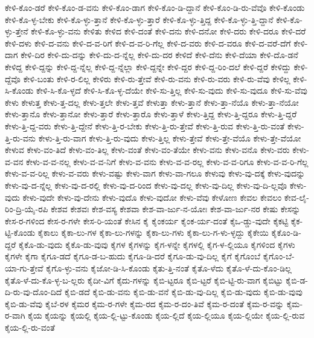 {ಕೇಳಿ-ಕೊಂ-ಡರೆ
ಕೇಳಿ-ಕೊಂ-ಡ-ವನು
ಕೇಳಿ-ಕೊಂ-ಡಾಗ
ಕೇಳಿ-ಕೊಂ-ಡಿ-ದ್ದಾನೆ
ಕೇಳಿ-ಕೊಂ-ಡಿ-ರು-ವೆವೊ
ಕೇಳಿ-ಕೊಂಡು
ಕೇಳಿ-ಕೊ-ಳ್ಳ-ಬೇಕು
ಕೇಳಿ-ಕೊ-ಳ್ಳು-ತ್ತಾನೆ
ಕೇಳಿ-ಕೊ-ಳ್ಳು-ತ್ತಾರೆ
ಕೇಳಿ-ಕೊ-ಳ್ಳು-ತ್ತಿದ್ದ
ಕೇಳಿ-ಕೊ-ಳ್ಳು-ತ್ತಿ-ದ್ದಾನೆ
ಕೇಳಿ-ಕೊ-ಳ್ಳು-ತ್ತೇನೆ
ಕೇಳಿ-ಕೊ-ಳ್ಳು-ವನು
ಕೇಳಿತು
ಕೇಳಿದ
ಕೇಳಿ-ದಂತೆ
ಕೇಳಿ-ದನು
ಕೇಳಿ-ದನೋ
ಕೇಳಿ-ದರು
ಕೇಳಿ-ದರೂ
ಕೇಳಿ-ದರೆ
ಕೇಳಿ-ದಳು
ಕೇಳಿ-ದ-ವನು
ಕೇಳಿ-ದ-ವ-ರಿಗೆ
ಕೇಳಿ-ದ-ವ-ರಿ-ಗೆಲ್ಲ
ಕೇಳಿ-ದ-ವರು
ಕೇಳಿ-ದ-ವರೂ
ಕೇಳಿ-ದ-ವರೆ-ದೆಗೆ
ಕೇಳಿ-ದಾಗ
ಕೇಳಿ-ದಿರ
ಕೇಳಿ-ದು-ದನ್ನು
ಕೇಳಿ-ದು-ದ-ನ್ನೆಲ್ಲ
ಕೇಳಿ-ದು-ದರ
ಕೇಳಿದೆ
ಕೇಳಿ-ದೆನು
ಕೇಳಿ-ದೆಯಾ
ಕೇಳಿ-ದೊ-ಡನೆ
ಕೇಳಿದ್ದ
ಕೇಳಿ-ದ್ದನ್ನು
ಕೇಳಿ-ದ್ದ-ನ್ನೆಲ್ಲ
ಕೇಳಿ-ದ್ದ-ನ್ನೆಲ್ಲಾ
ಕೇಳಿ-ದ್ದನ್ನೇ
ಕೇಳಿ-ದ್ದರ
ಕೇಳಿ-ದ್ದ-ರಿಂ-ದಲೆ
ಕೇಳಿ-ದ್ದರೆ
ಕೇಳಿದ್ದು
ಕೇಳಿ-ದ್ದೆವೊ
ಕೇಳಿ-ಬಂತು
ಕೇಳಿ-ರ-ಲಿಲ್ಲ
ಕೇಳಿರು
ಕೇಳಿ-ರು-ತ್ತೇವೆ
ಕೇಳಿ-ರು-ವನು
ಕೇಳಿ-ರು-ವರು
ಕೇಳಿ-ರು-ವೆವು
ಕೇಳಿಲ್ಲ
ಕೇಳಿ-ಸಿ-ಕೊಂಡು
ಕೇಳಿ-ಸಿ-ಕೊ-ಳ್ಳದೆ
ಕೇಳಿ-ಸಿ-ಕೊ-ಳ್ಳ-ದೆಯೇ
ಕೇಳಿ-ಸು-ತ್ತಿಲ್ಲ
ಕೇಳಿ-ಸು-ವುದು
ಕೇಳಿ-ಸು-ವುದೂ
ಕೇಳಿ-ಸು-ವೆವು
ಕೇಳು
ಕೇಳುತ್ತ
ಕೇಳು-ತ್ತ-ದಲ್ಲ
ಕೇಳು-ತ್ತಲೇ
ಕೇಳು-ತ್ತವೆ
ಕೇಳುತ್ತಾ
ಕೇಳು-ತ್ತಾನೆ
ಕೇಳು-ತ್ತಾ-ನೆಯೊ
ಕೇಳು-ತ್ತಾ-ನೆಯೋ
ಕೇಳು-ತ್ತಾನೊ
ಕೇಳು-ತ್ತಾನೋ
ಕೇಳು-ತ್ತಾರೆ
ಕೇಳು-ತ್ತಾರೊ
ಕೇಳು-ತ್ತಾಳೆ
ಕೇಳು-ತ್ತಿದ್ದ
ಕೇಳು-ತ್ತಿ-ದ್ದರೂ
ಕೇಳು-ತ್ತಿ-ದ್ದರೆ
ಕೇಳು-ತ್ತಿ-ದ್ದ-ವರು
ಕೇಳು-ತ್ತಿ-ದ್ದೇನೆ
ಕೇಳು-ತ್ತಿ-ರ-ಬೇಕು
ಕೇಳು-ತ್ತಿ-ರು-ತ್ತೇವೆ
ಕೇಳು-ತ್ತಿ-ರುವ
ಕೇಳು-ತ್ತಿ-ರು-ವಂತೆ
ಕೇಳು-ತ್ತಿ-ರು-ವನು
ಕೇಳು-ತ್ತಿ-ರು-ವಾಗ
ಕೇಳು-ತ್ತಿ-ರು-ವುದು
ಕೇಳು-ತ್ತಿಲ್ಲ
ಕೇಳು-ತ್ತೇವೆ
ಕೇಳು-ತ್ತೇ-ವೆಯೊ
ಕೇಳು-ತ್ತೇ-ವೆಯೋ
ಕೇಳುವ
ಕೇಳು-ವಂ-ತಿದೆ
ಕೇಳು-ವಂ-ತಿಲ್ಲ
ಕೇಳು-ವಂತೆ
ಕೇಳು-ವಂ-ತೆಯೇ
ಕೇಳು-ವನು
ಕೇಳು-ವನೊ
ಕೇಳು-ವರು
ಕೇಳು-ವ-ವನ
ಕೇಳು-ವ-ವ-ನಲ್ಲ
ಕೇಳು-ವ-ವ-ನಿಗೆ
ಕೇಳು-ವ-ವನು
ಕೇಳು-ವ-ವ-ರಲ್ಲ
ಕೇಳು-ವ-ವ-ರಿಗೂ
ಕೇಳು-ವ-ವ-ರಿ-ಗೆಲ್ಲ
ಕೇಳು-ವ-ವ-ರಿಲ್ಲ
ಕೇಳು-ವ-ವರು
ಕೇಳು-ವಷ್ಟು
ಕೇಳು-ವಾಗ
ಕೇಳು-ವಾ-ಗಲೂ
ಕೇಳುವು
ಕೇಳು-ವು-ದಕ್ಕೆ
ಕೇಳು-ವುದನ್ನು
ಕೇಳು-ವು-ದ-ನ್ನೆಲ್ಲ
ಕೇಳು-ವು-ದ-ರಲ್ಲಿ
ಕೇಳು-ವು-ದ-ರಿಂದ
ಕೇಳು-ವು-ದಲ್ಲ
ಕೇಳು-ವು-ದಿಲ್ಲ
ಕೇಳು-ವು-ದಿ-ಲ್ಲವೊ
ಕೇಳು-ವುದು
ಕೇಳು-ವುದೇ
ಕೇಳು-ವು-ದೇನು
ಕೇಳು-ವುದೊ
ಕೇಳು-ವುದೋ
ಕೇಳು-ವೆವು
ಕೇಳೋಣ
ಕೇವಲ
ಕೇವಲಂ
ಕೇವ-ಲೈ-ರಿಂ-ದ್ರಿ-ಯೈ-ರಪಿ
ಕೇಶವ
ಕೇಶವಃ
ಕೇಶ-ವಸ್ಯ
ಕೇಶವಾ
ಕೇಶ-ವಾ-ರ್ಜು-ನ-ಯೋಃ
ಕೇಶ-ವಾ-ರ್ಜು-ನರ
ಕೇಷು
ಕೇಸನ್ನು
ಕೇಸ-ರ-ಗಳಿಂದ
ಕೇಸ-ರ-ಗಳೇ
ಕೇಸ-ರಿ-ಯಂತೆ
ಕೇಸಿನ
ಕೈ
ಕೈಂಕರ್ಯ
ಕೈಂಕ-ರ್ಯ-ದಂತೆ
ಕೈಒ-ಡ್ಡು-ವುದೇ
ಕೈಕಟ್ಟಿ
ಕೈಕ-ಟ್ಟಿ-ಕೊಂಡು
ಕೈಕಾಲು
ಕೈಕಾ-ಲು-ಗಳ
ಕೈಕಾ-ಲು-ಗಳನ್ನು
ಕೈಕಾ-ಲು-ಗಳು
ಕೈಕಾ-ಲು-ಗ-ಳು-ಳ್ಳದ್ದು
ಕೈಕೇಯಿ
ಕೈಕೊಂ-ಡಿ-ದ್ದರೆ
ಕೈಕೊ-ಡು-ವುದು
ಕೈಕೊ-ಡು-ವುವು
ಕೈಗಳ
ಕೈಗಳನ್ನು
ಕೈಗ-ಳನ್ನೇ
ಕೈಗಳಲ್ಲಿ
ಕೈಗ-ಳ-ಲ್ಲಿಯೂ
ಕೈಗಳಿಂದ
ಕೈಗಳು
ಕೈಗಳೇ
ಕೈಗಾ
ಕೈಗೂ-ಡದೆ
ಕೈಗೂ-ಡ-ಬ-ಹುದು
ಕೈಗೂ-ಡಿ-ದರೆ
ಕೈಗೂ-ಡು-ವು-ದಿಲ್ಲ
ಕೈಗೆ
ಕೈಗೊಂಬೆ
ಕೈಗೊಂ-ಬೆ-ಯಾ-ಗು-ತ್ತೇವೆ
ಕೈಗೊ-ಳ್ಳು-ವನು
ಕೈಜೋ-ಡಿ-ಸಿ-ಕೊಂಡು
ಕೈತು-ತ್ತಿ-ನಂತೆ
ಕೈತೊ-ಳೆದು
ಕೈತೊ-ಳೆ-ದು-ಕೊಂ-ಡಿಲ್ಲ
ಕೈತೊ-ಳೆ-ದು-ಕೊ-ಳ್ಳ-ಬ-ಲ್ಲರು
ಕೈದೀ-ವಿಗೆ
ಕೈದು-ಗಳನ್ನು
ಕೈಬಿ-ಟ್ಟರೂ
ಕೈಬಿ-ಟ್ಟರೆ
ಕೈಬಿ-ಟ್ಟಿ-ರು-ವಾಗ
ಕೈಬಿಟ್ಟು
ಕೈಬಿ-ಡ-ದಿ-ರು-ವು-ದೊಂ-ದಿದೆ
ಕೈಬಿ-ಡದೆ
ಕೈಬಿ-ಡು-ವನು
ಕೈಬಿ-ಡು-ವನೆ
ಕೈಬಿ-ಡು-ವು-ದಿಲ್ಲ
ಕೈಬಿ-ಡು-ವುದು
ಕೈಬಿ-ಡು-ವುವು
ಕೈಬಿ-ಡು-ವೆವು
ಕೈಬೆ-ರಳ
ಕೈಮರ
ಕೈಮ-ರ-ಗಳೇ
ಕೈಮ-ರದ
ಕೈಮ-ರ-ದಂ-ತಿವೆ
ಕೈಮ-ರ-ದಂತೆ
ಕೈಮ-ರ-ವನ್ನು
ಕೈಮ-ರ-ವಾಗಿ
ಕೈಯ
ಕೈಯನ್ನು
ಕೈಯಲ್ಲಿ
ಕೈಯ-ಲ್ಲಿ-ಟ್ಟು-ಕೊಂಡು
ಕೈಯ-ಲ್ಲಿದೆ
ಕೈಯ-ಲ್ಲಿಯೂ
ಕೈಯ-ಲ್ಲಿಯೇ
ಕೈಯ-ಲ್ಲಿ-ರುವ
ಕೈಯ-ಲ್ಲಿ-ರು-ವಂತೆ
}
